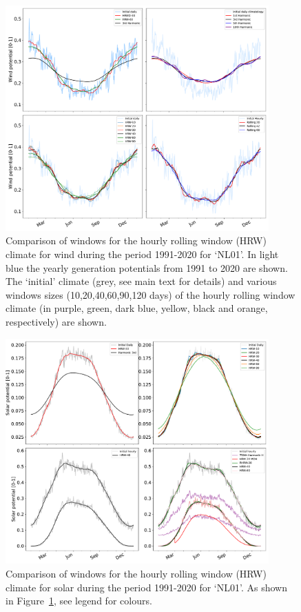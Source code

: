 \documentclass[12pt]{iopart}
\begin{document}
\begin{figure}[b]
    \centering
    \includegraphics[width=0.9\textwidth]{Figures_SI/Fig_ClimatologyComparison_WON}
    \caption{
    Comparison of windows for the hourly rolling window (HRW) climate for wind during the period 1991-2020 for `NL01'. 
    In light blue the yearly generation potentials from 1991 to 2020 are shown. 
    The `initial' climate (grey, see main text for details) and various windows sizes (10,20,40,60,90,120 days) of the hourly rolling window climate (in purple, green, dark blue, yellow, black and orange, respectively) are shown.}
    \label{SIfig:clima_daily-harmonics_spv}
\end{figure}

\begin{figure}[t]
    \centering
    \includegraphics[width=0.9\textwidth]{Figures_SI/Fig_ClimatologyComparison_SPV}
    \caption{
    Comparison of windows for the hourly rolling window (HRW) climate for solar during the period 1991-2020 for `NL01'. 
    As shown in Figure~\ref{SIfig:clima_daily-harmonics_spv}, see legend for colours. }
    \label{SIfig:clima_daily-harmonics_won}
\end{figure}
\end{document}
